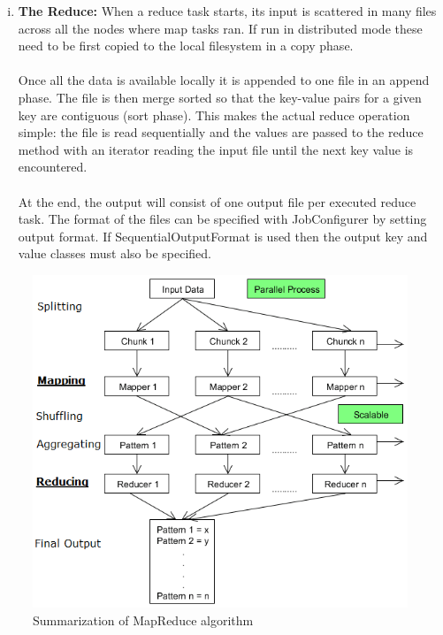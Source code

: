 \documentclass[a4paper,12pt,oneside]{report}
\begin{document}
\begin{enumerate}[(i)]
        \item \textbf{The Reduce:}
                When a reduce task starts, its input is scattered in many files across all the nodes where map tasks 
                ran. If run in distributed mode these need to be first copied to the local filesystem in a copy phase.\\ 
                \\
                Once all the data is available locally it is appended to one file in an append phase. The file is then 
                merge sorted so that the key-value pairs for a given key are contiguous (sort phase). This makes the 
                actual reduce operation simple: the file is read sequentially and the values are passed to the reduce 
                method with an iterator reading the input file until the next key value is encountered.\\
                \\
                At the end, the output will consist of one output file per executed reduce task. The format of the files 
                can be specified with JobConfigurer by setting output format. If SequentialOutputFormat is used then 
                the output key and value classes must also be specified. 

\end{enumerate}
\begin{figure}[h!]
        \centering
        \includegraphics[width=170mm]{mapreducealgorithm}
        \caption{Summarization of MapReduce algorithm}
\end{figure}
\end{document}
